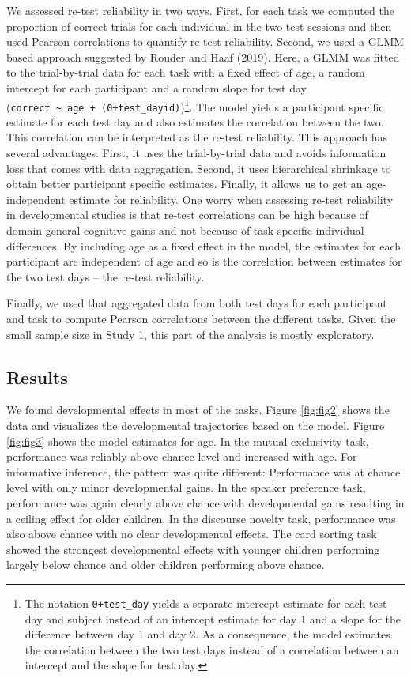 \documentclass[
  english,
  man,floatsintext]{apa6}
\begin{document}
We assessed re-test reliability in two ways. First, for each task we computed the proportion of correct trials for each individual in the two test sessions and then used Pearson correlations to quantify re-test reliability. Second, we used a GLMM based approach suggested by Rouder and Haaf (2019). Here, a GLMM was fitted to the trial-by-trial data for each task with a fixed effect of age, a random intercept for each participant and a random slope for test day (\texttt{correct\ \textasciitilde{}\ age\ +\ (0+test\_day\textbar{}id)})\footnote{The notation \texttt{0+test\_day} yields a separate intercept estimate for each test day and subject instead of an intercept estimate for day 1 and a slope for the difference between day 1 and day 2. As a consequence, the model estimates the correlation between the two test days instead of a correlation between an intercept and the slope for test day.}. The model yields a participant specific estimate for each test day and also estimates the correlation between the two. This correlation can be interpreted as the re-test reliability. This approach has several advantages. First, it uses the trial-by-trial data and avoids information loss that comes with data aggregation. Second, it uses hierarchical shrinkage to obtain better participant specific estimates. Finally, it allows us to get an age-independent estimate for reliability. One worry when assessing re-test reliability in developmental studies is that re-test correlations can be high because of domain general cognitive gains and not because of task-specific individual differences. By including age as a fixed effect in the model, the estimates for each participant are independent of age and so is the correlation between estimates for the two test days -- the re-test reliability.

Finally, we used that aggregated data from both test days for each participant and task to compute Pearson correlations between the different tasks. Given the small sample size in Study 1, this part of the analysis is mostly exploratory.

\hypertarget{results}{%
\subsection{Results}\label{results}}

We found developmental effects in most of the tasks. Figure \ref{fig:fig2} shows the data and visualizes the developmental trajectories based on the model. Figure \ref{fig:fig3} shows the model estimates for age. In the mutual exclusivity task, performance was reliably above chance level and increased with age. For informative inference, the pattern was quite different: Performance was at chance level with only minor developmental gains. In the speaker preference task, performance was again clearly above chance with developmental gains resulting in a ceiling effect for older children. In the discourse novelty task, performance was also above chance with no clear developmental effects. The card sorting task showed the strongest developmental effects with younger children performing largely below chance and older children performing above chance.
\end{document}
